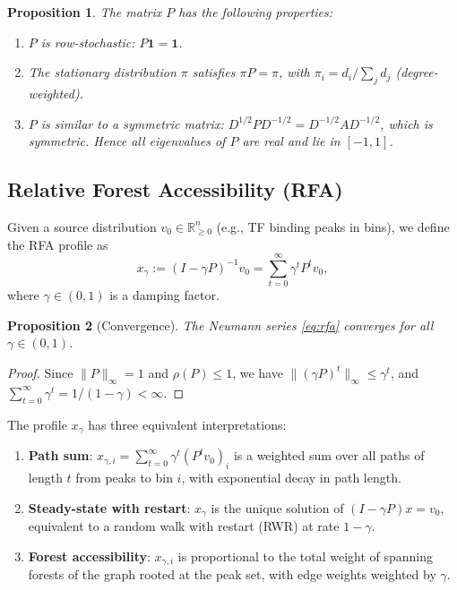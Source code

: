 \documentclass[11pt,a4paper]{article}
\newtheorem{proposition}{Proposition}
\begin{document}
\begin{proposition}
The matrix $P$ has the following properties:
\begin{enumerate}
    \item $P$ is row-stochastic: $P \mathbf{1} = \mathbf{1}$.
    \item The stationary distribution $\pi$ satisfies $\pi P = \pi$, with $\pi_i = d_i / \sum_j d_j$ (degree-weighted).
    \item $P$ is similar to a symmetric matrix: $D^{1/2} P D^{-1/2} = D^{-1/2} A D^{-1/2}$, which is symmetric. Hence all eigenvalues of $P$ are real and lie in $[-1, 1]$.
\end{enumerate}
\end{proposition}

\subsection{Relative Forest Accessibility (RFA)}

Given a source distribution $v_0 \in \mathbb{R}_{\geq 0}^n$ (e.g., TF binding peaks in bins), we define the RFA profile as
\begin{equation}
x_\gamma := (I - \gamma P)^{-1} v_0 = \sum_{t=0}^{\infty} \gamma^t P^t v_0,
\label{eq:rfa}
\end{equation}
where $\gamma \in (0,1)$ is a damping factor.

\begin{proposition}[Convergence]
The Neumann series \eqref{eq:rfa} converges for all $\gamma \in (0,1)$.
\end{proposition}
\begin{proof}
Since $\|P\|_\infty = 1$ and $\rho(P) \leq 1$, we have $\|(\gamma P)^t\|_\infty \leq \gamma^t$, and $\sum_{t=0}^\infty \gamma^t = 1/(1-\gamma) < \infty$.
\end{proof}

The profile $x_\gamma$ has three equivalent interpretations:
\begin{enumerate}
    \item \textbf{Path sum}: $x_{\gamma,i} = \sum_{t=0}^\infty \gamma^t (P^t v_0)_i$ is a weighted sum over all paths of length $t$ from peaks to bin $i$, with exponential decay in path length.
    \item \textbf{Steady-state with restart}: $x_\gamma$ is the unique solution of $(I - \gamma P) x = v_0$, equivalent to a random walk with restart (RWR) at rate $1-\gamma$.
    \item \textbf{Forest accessibility}: $x_{\gamma,i}$ is proportional to the total weight of spanning forests of the graph rooted at the peak set, with edge weights weighted by $\gamma$.
\end{enumerate}
\end{document}

